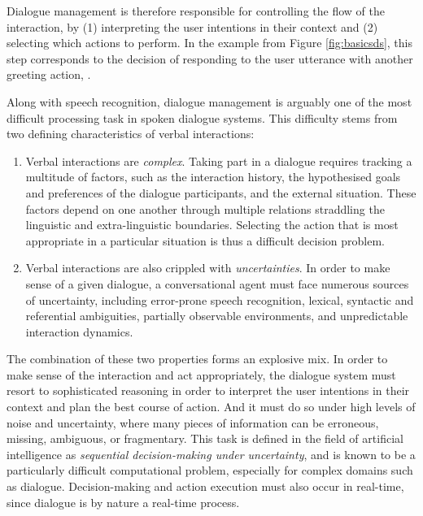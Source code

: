 Dialogue management is therefore responsible for controlling the flow of the interaction, by (1) interpreting the user intentions in their context and (2) selecting which actions to perform. In the example from Figure \ref{fig:basicsds}, this step corresponds to the decision of responding to the user utterance  with another greeting action, . 

Along with speech recognition, dialogue management is arguably one of the most difficult processing task in spoken dialogue systems. This difficulty stems from two defining characteristics of verbal interactions:
\begin{enumerate}
\item Verbal interactions are \textit{complex}.   Taking part in a dialogue requires tracking a multitude of factors, such as the interaction history, the hypothesised goals and preferences of the dialogue participants, and the external situation. These factors depend on one another through multiple relations straddling the linguistic and extra-linguistic boundaries.  Selecting the action that is most appropriate in a particular situation is thus a difficult decision problem. 

\item Verbal interactions are also crippled with \textit{uncertainties}.  In order to make sense of a given dialogue, a conversational agent must face numerous sources of uncertainty, including error-prone speech recognition, lexical,  syntactic and referential ambiguities, partially observable environments, and unpredictable interaction dynamics.  
\end{enumerate} 

The combination of these two properties forms an explosive mix.  In order to make sense of the interaction and act appropriately, the dialogue system must resort to sophisticated reasoning in order to interpret the user intentions in their context and plan the best course of action.  And it must do so under high levels of noise and uncertainty, where many pieces of information can be erroneous, missing, ambiguous, or fragmentary. This task is defined in the field of artificial intelligence as \textit{sequential decision-making under uncertainty}, and is known to be a particularly difficult computational problem, especially for complex domains such as dialogue. 
Decision-making and action execution must also occur in real-time, since dialogue is by nature a real-time process. 

